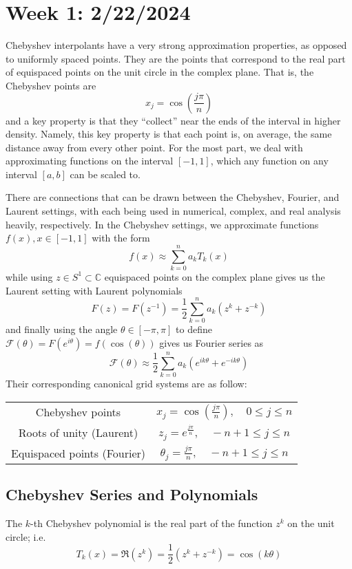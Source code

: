\section{Week 1: 2/22/2024}
Chebyshev interpolants have a very strong approximation properties, as opposed to uniformly spaced points. They are the points that correspond to the real part of equispaced points on the unit circle in the complex plane. That is, the Chebyshev points are
\[ x_j = \cos\left(\frac{j\pi}{n}\right) \]
and a key property is that they ``collect'' near the ends of the interval in higher density. Namely, this key property is that each point is, on average, the same distance away from every other point.
For the most part, we deal with approximating functions on the interval $[-1, 1]$, which any function on any interval $[a, b]$ can be scaled to.

There are connections that can be drawn between the Chebyshev, Fourier, and Laurent settings, with each being used in numerical, complex, and real analysis heavily, respectively. In the Chebyshev settings, we approximate functions $f(x), x \in [-1, 1]$ with the form
\[ f(x) \approx \sum_{k=0}^n a_kT_k(x) \]
while using $z \in S^1 \subset \mathbb{C}$ equispaced points on the complex plane gives us the Laurent setting with Laurent polynomials
\[ F(z) = F(z^{-1}) = \frac{1}{2}\sum_{k=0}^n a_k (z^k + z^{-k}) \]
and finally using the angle $\theta \in [-\pi, \pi]$ to define $\mathcal{F}(\theta) = F(e^{i\theta}) = f(\cos(\theta))$ gives us Fourier series as
\[ \mathcal{F}(\theta) \approx \frac{1}{2}\sum_{k=0}^n a_k(e^{ik\theta} + e ^{-ik\theta}) \]
Their corresponding canonical grid systems are as follow:
\begin{center}
	\begin{tabular}{cc}
		Chebyshev points            & $x_j = \cos\left(\frac{j\pi}{n}\right), \quad 0 \leq j \leq n$ \\
		Roots of unity (Laurent)    & $z_j = e^{\frac{j\pi}{n}}, \quad -n+1\leq j \leq n$            \\
		Equispaced points (Fourier) & $\theta_j = \frac{j\pi}{n}, \quad -n+1 \leq j \leq n$
	\end{tabular}
\end{center}

\subsection{Chebyshev Series and Polynomials}
\begin{dfn}
	The $k$-th Chebyshev polynomial is the real part of the function $z^k$ on the unit circle; i.e.
	\[ T_k(x) = \Re (z^k) = \frac{1}{2}(z^k + z^{-k}) = \cos(k\theta) \]
\end{dfn}

